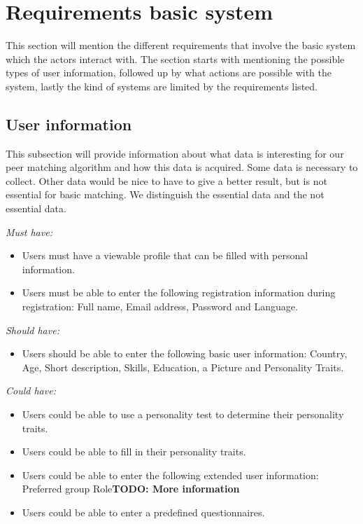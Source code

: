 \documentclass[]{article}
\newcommand{\TODO}[1]{{\color{red}\textbf{TODO: #1}}}
\newcommand{\reqr}[1]{{\noindent\emph{#1:}}}
\begin{document}
\section{Requirements basic system}
This section will mention the different requirements that involve the basic system which the actors interact with.
The section starts with mentioning the possible types of user information, followed up by what actions are possible with the system, lastly the kind of systems are limited by the requirements listed.

\subsection{User information}
This subsection will provide information about what data is interesting for our peer matching algorithm and how this data is acquired.
Some data is necessary to collect. 
Other data would be nice to have to give a better result, but is not essential for basic matching.
We distinguish the essential data and the not essential data.

\reqr{Must have}
\begin{itemize}
\item Users must have a viewable profile that can be filled with personal information.
\item Users must be able to enter the following registration information during registration: Full name, Email address, Password and Language.
\end{itemize}

\reqr{Should have}
\begin{itemize}
\item Users should be able to enter the following basic user information: Country, Age, Short description, Skills, Education, a Picture and Personality Traits.
\end{itemize}

\reqr{Could have}
\begin{itemize}
\item Users could be able to use a personality test to determine their personality traits.
\item Users could be able to fill in their personality traits.
\item Users could be able to enter the following extended user information: Preferred group Role\TODO{More information}
\item Users could be able to enter a predefined questionnaires.
\end{itemize}
\end{document}
